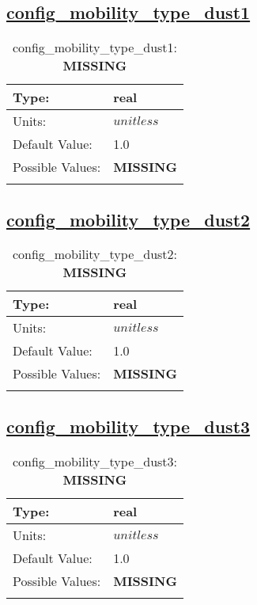 \subsection[config\_mobility\_type\_dust1]{\hyperref[sec:nm_tab_biogeochemistry]{config\_mobility\_type\_dust1}}
\label{subsec:nm_sec_config_mobility_type_dust1}
\begin{center}
\begin{longtable}{| p{2.0in} || p{4.0in} |}
    \hline
    Type: & real \\
    \hline
    Units: & $unitless$ \\
    \hline
    Default Value: & 1.0 \\
    \hline
    Possible Values: & {\bf \color{red} MISSING} \\
    \hline
    \caption{config\_mobility\_type\_dust1: {\bf \color{red} MISSING}}
\end{longtable}
\end{center}
\subsection[config\_mobility\_type\_dust2]{\hyperref[sec:nm_tab_biogeochemistry]{config\_mobility\_type\_dust2}}
\label{subsec:nm_sec_config_mobility_type_dust2}
\begin{center}
\begin{longtable}{| p{2.0in} || p{4.0in} |}
    \hline
    Type: & real \\
    \hline
    Units: & $unitless$ \\
    \hline
    Default Value: & 1.0 \\
    \hline
    Possible Values: & {\bf \color{red} MISSING} \\
    \hline
    \caption{config\_mobility\_type\_dust2: {\bf \color{red} MISSING}}
\end{longtable}
\end{center}
\subsection[config\_mobility\_type\_dust3]{\hyperref[sec:nm_tab_biogeochemistry]{config\_mobility\_type\_dust3}}
\label{subsec:nm_sec_config_mobility_type_dust3}
\begin{center}
\begin{longtable}{| p{2.0in} || p{4.0in} |}
    \hline
    Type: & real \\
    \hline
    Units: & $unitless$ \\
    \hline
    Default Value: & 1.0 \\
    \hline
    Possible Values: & {\bf \color{red} MISSING} \\
    \hline
    \caption{config\_mobility\_type\_dust3: {\bf \color{red} MISSING}}
\end{longtable}
\end{center}
